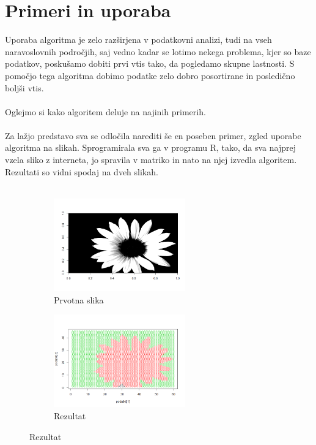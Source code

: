 \documentclass[a4paper, 10pt]{article}
\begin{document}
\section{Primeri in uporaba}

Uporaba algoritma je zelo razširjena v podatkovni analizi, tudi na vseh naravoslovnih področjih, saj vedno kadar se lotimo nekega problema, kjer so baze podatkov, poskušamo dobiti prvi vtis tako, da pogledamo skupne lastnosti. S pomočjo tega algoritma dobimo podatke zelo dobro posortirane in posledično boljši vtis.\\
\\
Oglejmo si kako algoritem deluje na najinih primerih.\\
\\
Za lažjo predstavo sva se odločila narediti še en poseben primer, zgled uporabe algoritma na slikah. Sprogramirala sva ga v programu R, tako, da sva najprej vzela sliko z interneta, jo spravila v matriko in nato na njej izvedla algoritem. Rezultati so vidni spodaj na dveh slikah.\\
\\
\begin{figure}[h]
 
\begin{subfigure}{0.5\textwidth}
\includegraphics[width=\linewidth, height=4cm]{prva} 
\caption{Prvotna slika}
\label{fig:subim1}
\end{subfigure}
\begin{subfigure}{0.5\textwidth}
\includegraphics[width=\linewidth, height=4cm]{druga}
\caption{Rezultat}
\label{fig:subim2}
\end{subfigure}
 
\end{figure}
\end{document}
